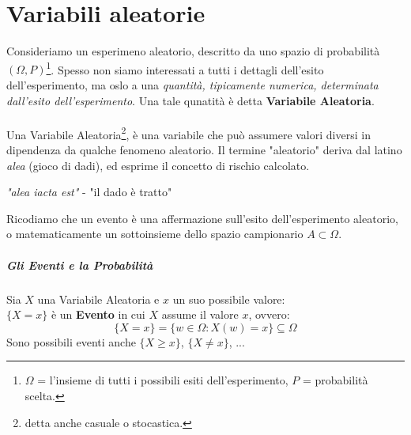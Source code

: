 \chapter{Variabili aleatorie}
Consideriamo un esperimeno aleatorio, descritto da uno spazio di probabilità 
$(\Omega, P)$\footnote{$\Omega$ = l'insieme di tutti i possibili esiti dell'esperimento, $P$ = probabilità scelta.}.
Spesso non siamo interessati a tutti i dettagli dell'esito dell'esperimento, ma oslo a una \emph{quantità, tipicamente numerica, determinata dall'esito dell'esperimento}.
Una tale qunatità è detta \textbf{Variabile Aleatoria}.
\\\\Una Variabile Aleatoria\footnote{detta anche casuale o stocastica.}, è una variabile che può assumere valori diversi in dipendenza da qualche fenomeno aleatorio.
Il termine "aleatorio" deriva dal latino \textit{alea} (gioco di dadi), ed esprime il
concetto di rischio calcolato.
\begin{center}
	\textit{"alea iacta est"} - "il dado è tratto"
\end{center}

Ricodiamo che un evento è una affermazione sull'esito dell'esperimento aleatorio, o matematicamente un
sottoinsieme dello spazio campionario $A \subset \Omega$.

\paragraph{Gli Eventi e la Probabilità}
Sia $X$ una Variabile Aleatoria e $x$ un suo possibile valore:
\\$\{X = x\}$ è un \textbf{Evento} in cui $X$ assume il valore $x$, ovvero:
\[\{X = x\}= \{w \in \Omega: X(w) = x\} \subseteq \Omega\]
Sono possibili eventi anche $\{X \geq x\}$, $\{X \neq x\}$, ...

